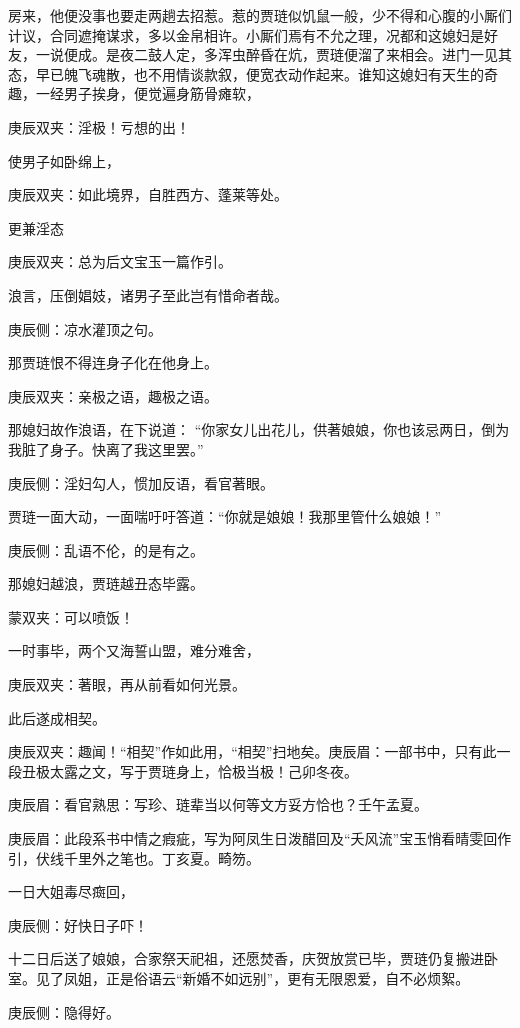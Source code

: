 \begin{parag}
房来，他便没事也要走两趟去招惹。惹的贾琏似饥鼠一般，少不得和心腹的小厮们计议，合同遮掩谋求，多以金帛相许。小厮们焉有不允之理，况都和这媳妇是好友，一说便成。是夜二鼓人定，多浑虫醉昏在炕，贾琏便溜了来相会。进门一见其态，早已魄飞魂散，也不用情谈款叙，便宽衣动作起来。谁知这媳妇有天生的奇趣，一经男子挨身，便觉遍身筋骨瘫软，\begin{note}庚辰双夹：淫极！亏想的出！\end{note}使男子如卧绵上，\begin{note}庚辰双夹：如此境界，自胜西方、蓬莱等处。\end{note}更兼淫态\begin{note}庚辰双夹：总为后文宝玉一篇作引。\end{note}浪言，压倒娼妓，诸男子至此岂有惜命者哉。\begin{note}庚辰侧：凉水灌顶之句。\end{note}那贾琏恨不得连身子化在他身上。\begin{note}庚辰双夹：亲极之语，趣极之语。\end{note}那媳妇故作浪语，在下说道： “你家女儿出花儿，供著娘娘，你也该忌两日，倒为我脏了身子。快离了我这里罢。”\begin{note}庚辰侧：淫妇勾人，惯加反语，看官著眼。\end{note}贾琏一面大动，一面喘吁吁答道：“你就是娘娘！我那里管什么娘娘！”\begin{note}庚辰侧：乱语不伦，的是有之。\end{note}那媳妇越浪，贾琏越丑态毕露。\begin{note}蒙双夹：可以喷饭！\end{note}一时事毕，两个又海誓山盟，难分难舍，\begin{note}庚辰双夹：著眼，再从前看如何光景。\end{note}此后遂成相契。\begin{note}庚辰双夹：趣闻！“相契”作如此用，“相契”扫地矣。庚辰眉：一部书中，只有此一段丑极太露之文，写于贾琏身上，恰极当极！己卯冬夜。\end{note}\begin{note}庚辰眉：看官熟思：写珍、琏辈当以何等文方妥方恰也？壬午孟夏。\end{note}\begin{note}庚辰眉：此段系书中情之瘕疵，写为阿凤生日泼醋回及“夭风流”宝玉悄看晴雯回作引，伏线千里外之笔也。丁亥夏。畸笏。\end{note}
\end{parag}


\begin{parag}
    一日大姐毒尽癍回，\begin{note}庚辰侧：好快日子吓！\end{note}十二日后送了娘娘，合家祭天祀祖，还愿焚香，庆贺放赏已毕，贾琏仍复搬进卧室。见了凤姐，正是俗语云“新婚不如远别”，更有无限恩爱，自不必烦絮。\begin{note}庚辰侧：隐得好。\end{note}
\end{parag}



